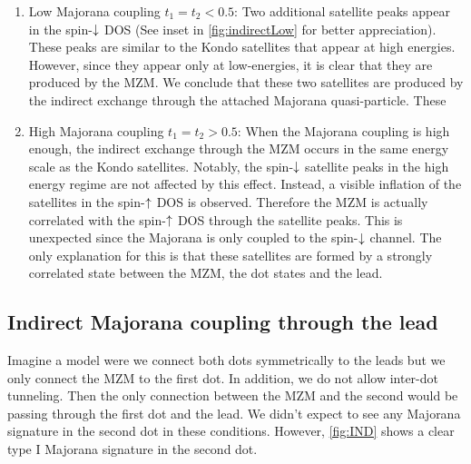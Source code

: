 \begin{enumerate}
 \item Low Majorana coupling $t_1=t_2 < 0.5$: Two additional satellite peaks appear in the spin-$\downarrow$ DOS (See inset in \ref{fig:indirectLow} for better appreciation). These peaks are similar to the  Kondo satellites that appear at high energies. However, since they appear only at low-energies, it is clear that they are produced by the MZM. We conclude that these two satellites are produced by the indirect exchange through the attached  Majorana quasi-particle. These  
 \item High Majorana coupling $t_1=t_2 > 0.5$: When the Majorana coupling is high enough, the indirect exchange through the MZM occurs in the same energy scale as the Kondo satellites. Notably, the spin-$\downarrow$ satellite peaks in the high energy regime are not affected by this effect. Instead, a visible inflation of the satellites in the spin-$\uparrow$ DOS is observed. Therefore the MZM is actually correlated with the spin-$\uparrow$ DOS through the satellite peaks. This is unexpected since the Majorana is only coupled to the spin-$\downarrow$ channel.  The only explanation for this is that these satellites are formed by a strongly correlated state between the MZM, the dot states and the lead. 
\end{enumerate}




\subsection{Indirect Majorana coupling through the lead}

Imagine a model were we connect both dots symmetrically to the leads but we only connect the MZM to the first dot. In addition, we do not allow inter-dot tunneling. Then the only connection between the MZM and the second would be passing through the first dot and  the lead. We didn't expect to see any Majorana signature in the second dot in these conditions. However, \ref{fig:IND} shows a clear type I Majorana signature in the second dot.

